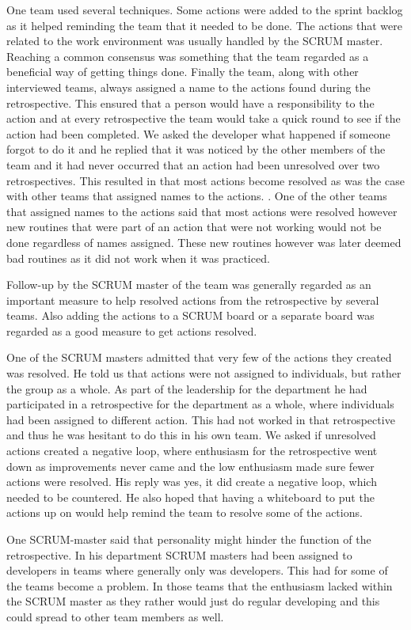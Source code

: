 One team used several techniques. Some actions were added to the sprint backlog as it helped reminding the team that it needed to be done. The actions that were related to the work environment was usually handled by the SCRUM master. Reaching a common consensus was something that the team regarded as a beneficial way of getting things done. Finally the team, along with other interviewed teams, always assigned a name to the actions found during the retrospective. This ensured that a person would have a responsibility to the action and at every retrospective the team would take a quick round to see if the action had been completed. We asked the developer what happened if someone forgot to do it and he replied that it was noticed by the other members of the team and it had never occurred that an action had been unresolved over two retrospectives. This resulted in that most actions become resolved as was the case with other teams that assigned names to the actions. . One of the other teams that assigned names to the actions said that most actions were resolved however new routines that were part of an action that were not working would not be done regardless of names assigned. These new routines however was later deemed bad routines as it did not work when it was practiced. 

Follow-up by the SCRUM master of the team was generally regarded as an important measure to help resolved actions from the retrospective by several teams. Also adding the actions to a SCRUM board or a separate board was regarded as a good measure to get actions resolved. 

One of the SCRUM masters admitted that very few of the actions they created was resolved. He told us that actions were not assigned to individuals, but rather the group as a whole. As part of the leadership for the department he had participated in a retrospective for the department as a whole, where individuals had been assigned to different action. This had not worked in that retrospective and thus he was hesitant to do this in his own team. We asked if unresolved actions created a negative loop, where enthusiasm for the retrospective went down as improvements never came and the low enthusiasm made sure fewer actions were resolved. His reply was yes, it did create a negative loop, which needed to be countered. He also hoped that having a whiteboard to put the actions up on would help remind the team to resolve some of the actions. 
 
\label{question-7}
One SCRUM-master said that personality might hinder the function of the retrospective. In his department SCRUM masters had been assigned to developers in teams where generally only was developers. This had for some of the teams become a problem. In those teams that the enthusiasm lacked within the SCRUM master as they rather would just do regular developing and this could spread to other team members as well. 

